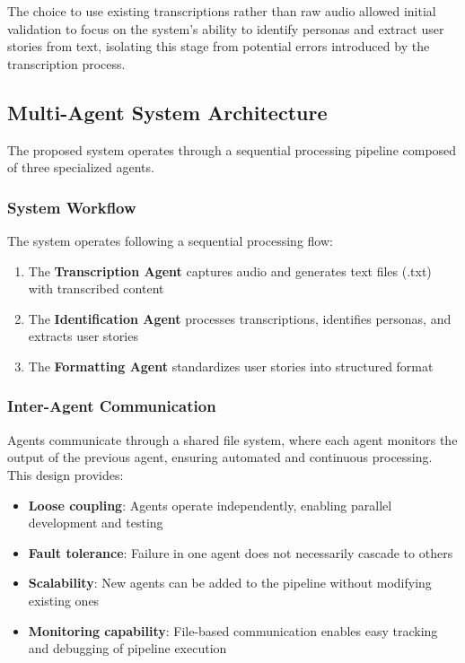 \documentclass[12pt]{article}
\begin{document}
The choice to use existing transcriptions rather than raw audio allowed initial validation to focus on the system's ability to identify personas and extract user stories from text, isolating this stage from potential errors introduced by the transcription process.


\subsection{Multi-Agent System Architecture}
\label{sec:architecture}

The proposed system operates through a sequential processing pipeline composed of three specialized agents.

\subsubsection{System Workflow}

The system operates following a sequential processing flow:

\begin{enumerate}
    \item The \textbf{Transcription Agent} captures audio and generates text files (.txt) with transcribed content
    \item The \textbf{Identification Agent} processes transcriptions, identifies personas, and extracts user stories
    \item The \textbf{Formatting Agent} standardizes user stories into structured format
\end{enumerate}

\subsubsection{Inter-Agent Communication}

Agents communicate through a shared file system, where each agent monitors the output of the previous agent, ensuring automated and continuous processing. This design provides:

\begin{itemize}
    \item \textbf{Loose coupling}: Agents operate independently, enabling parallel development and testing
    \item \textbf{Fault tolerance}: Failure in one agent does not necessarily cascade to others
    \item \textbf{Scalability}: New agents can be added to the pipeline without modifying existing ones
    \item \textbf{Monitoring capability}: File-based communication enables easy tracking and debugging of pipeline execution
\end{itemize}
\end{document}
